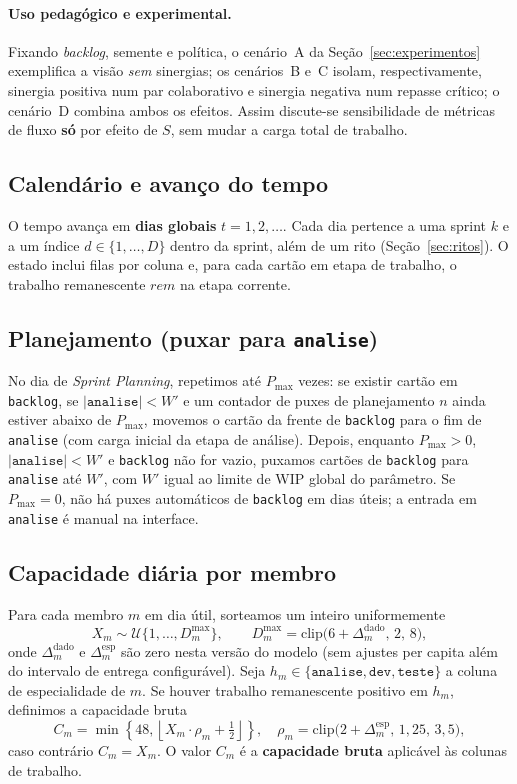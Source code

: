 \paragraph{Uso pedagógico e experimental.}
Fixando \emph{backlog}, semente e política, o cenário~A da Seção~\ref{sec:experimentos} exemplifica a visão \emph{sem} sinergias; os cenários~B e~C isolam, respectivamente, sinergia positiva num par colaborativo e sinergia negativa num repasse crítico; o cenário~D combina ambos os efeitos. Assim discute-se sensibilidade de métricas de fluxo \textbf{só} por efeito de $S$, sem mudar a carga total de trabalho.

\subsection{Calendário e avanço do tempo}
O tempo avança em \textbf{dias globais} $t=1,2,\dots$. Cada dia pertence a uma sprint $k$ e a um índice $d\in\{1,\dots,D\}$ dentro da sprint, além de um rito (Seção~\ref{sec:ritos}). O estado inclui filas por coluna e, para cada cartão em etapa de trabalho, o trabalho remanescente $\textit{rem}$ na etapa corrente.

\subsection{Planejamento (puxar para \texttt{analise})}
No dia de \emph{Sprint Planning}, repetimos até $P_{\max}$ vezes: se existir cartão em \texttt{backlog}, se $|\texttt{analise}|<W'$ e um contador de puxes de planejamento $n$ ainda estiver abaixo de $P_{\max}$, movemos o cartão da frente de \texttt{backlog} para o fim de \texttt{analise} (com carga inicial da etapa de análise). Depois, enquanto $P_{\max}>0$, $|\texttt{analise}|<W'$ e \texttt{backlog} não for vazio, puxamos cartões de \texttt{backlog} para \texttt{analise} até $W'$, com $W'$ igual ao limite de WIP global do parâmetro. Se $P_{\max}=0$, não há puxes automáticos de \texttt{backlog} em dias úteis; a entrada em \texttt{analise} é manual na interface.

\subsection{Capacidade diária por membro}
Para cada membro $m$ em dia útil, sorteamos um inteiro uniformemente
\[
X_m \sim \mathcal{U}\{1,\dots,D^{\max}_m\},\qquad
D^{\max}_m = \mathrm{clip}\big(6+\Delta^{\text{dado}}_m,\,2,\,8\big),
\]
onde $\Delta^{\text{dado}}_m$ e $\Delta^{\text{esp}}_m$ são zero nesta versão do modelo (sem ajustes per capita além do intervalo de entrega configurável). Seja $h_m\in\{\texttt{analise},\texttt{dev},\texttt{teste}\}$ a coluna de especialidade de $m$. Se houver trabalho remanescente positivo em $h_m$, definimos a capacidade bruta
\[
C_m = \min\left\{48,\left\lfloor X_m \cdot \rho_m + \tfrac{1}{2}\right\rfloor\right\},
\quad
\rho_m = \mathrm{clip}\big(2+\Delta^{\text{esp}}_m,\,1{,}25,\,3{,}5\big),
\]
caso contrário $C_m=X_m$. O valor $C_m$ é a \textbf{capacidade bruta} aplicável às colunas de trabalho.

